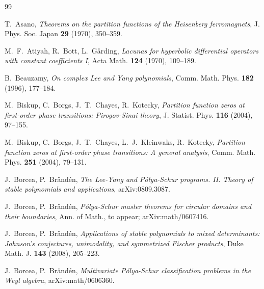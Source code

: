 \documentclass[10pt,reqno]{amsart}
\theoremstyle{plain}
\theoremstyle{definition}
\theoremstyle{remark}
\numberwithin{equation}{section}
\begin{document}
\begin{thebibliography}{99}


T.~Asano, {\em Theorems on the partition functions of the Heisenberg 
ferromagnets}, J. Phys. Soc. Japan {\bf 29} (1970), 350--359.

M.~F.~Atiyah, R.~Bott, L.~G\aa rding, {\em Lacunas for
hyperbolic differential operators with constant coefficients I},
Acta Math. {\bf 124} (1970), 109--189.



B.~Beauzamy, {\em On complex Lee and Yang polynomials}, 
Comm. Math. Phys. {\bf 182} (1996), 177--184. 

M.~Biskup, C.~Borgs, J.~T.~Chayes, R.~Kotecky, {\em Partition function zeros 
at first-order phase transitions: Pirogov-Sinai theory}, J. Statist. Phys. 
{\bf 116} (2004), 97--155.

M.~Biskup, C.~Borgs, J.~T.~Chayes, L.~J.~Kleinwaks, R.~Kotecky, {\em Partition 
function zeros at first-order phase transitions: A general analysis}, 
Comm. Math. Phys. {\bf 251} (2004), 79--131.

J.~Borcea, P.~Br\"and\'en, {\em The Lee-Yang 
and P\'olya-Schur programs. II. Theory of stable polynomials and applications},
arXiv:0809.3087.

J.~Borcea, P.~Br\"and\'en, {\em P\'olya-Schur master theorems for 
circular domains and their boundaries}, Ann. of Math., to appear; 
 arXiv:math/0607416.

J.~Borcea, P.~Br\"and\'en, {\em Applications of stable 
polynomials to mixed determinants: Johnson's conjectures, unimodality, and 
symmetrized Fischer products}, Duke Math. J. {\bf 143} (2008), 205--223.

J.~Borcea, P.~Br\"and\'en, {\em Multivariate P\'olya-Schur classification 
problems in the Weyl algebra}, arXiv:math/0606360.


\end{thebibliography}
\end{document}
